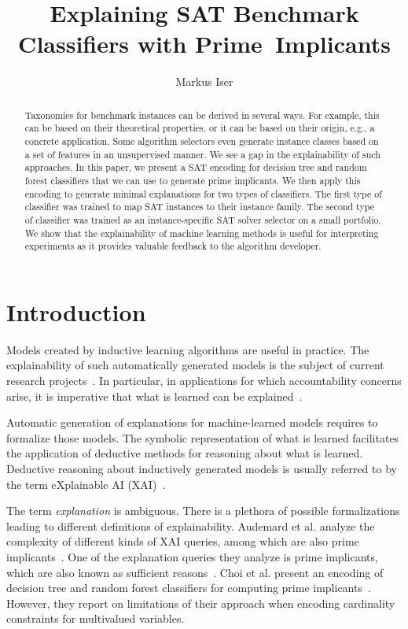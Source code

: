 \documentclass[a4paper, USenglish, cleveref, autoref, thm-restate]{lipics-v2021}
\title{Explaining SAT Benchmark Classifiers with Prime~Implicants}
\author{Markus Iser}{Karlsruhe Institute of Technology (KIT), Institute of Theoretical Informatics, Algorithm Engineering, Germany \and \url{https://algo2.iti.kit.edu/english/3986.php}}{markus.iser@kit.edu}{https://orcid.org/0000-0003-2904-232X}{}
\theoremstyle{definition}
\begin{document}
\maketitle
\begin{abstract}
Taxonomies for benchmark instances can be derived in several ways. For example, this can be based on their theoretical properties, or it can be based on their origin, e.g., a concrete application. 
Some algorithm selectors even generate instance classes based on a set of features in an unsupervised manner. 
We see a gap in the explainability of such approaches. 
In this paper, we present a SAT encoding for decision tree and random forest classifiers that we can use to generate prime implicants. 
We then apply this encoding to generate minimal explanations for two types of classifiers. 
The first type of classifier was trained to map SAT instances to their instance family.
The second type of classifier was trained as an instance-specific SAT solver selector on a small portfolio.
We show that the explainability of machine learning methods is useful for interpreting experiments as it provides valuable feedback to the algorithm developer.
\end{abstract}


\section{Introduction}

Models created by inductive learning algorithms are useful in practice.
The explainability of such automatically generated models is the subject of current research projects~\cite{Audemard:2021:Intelligibility, Darwiche:2020:Reasons}.
In particular, in applications for which accountability concerns arise, it is imperative that what is learned can be explained~\cite{Percy:2021:Accountability}. 

Automatic generation of explanations for machine-learned models requires to formalize those models. 
The symbolic representation of what is learned facilitates the application of deductive methods for reasoning about what is learned.
Deductive reasoning about inductively generated models is usually referred to by the term eXplainable AI (XAI)~\cite{Arrieta:2019:XAI}. 

The term \emph{explanation} is ambiguous. 
There is a plethora of possible formalizations leading to different definitions of explainability. 
Audemard et al. analyze the complexity of different kinds of XAI queries, among which are also prime implicants~\cite{Audemard:2020:XAI}. 
One of the explanation queries they analyze is prime implicants, which are also known as sufficient reasons~\cite{Darwiche:2020:Reasons}. 
Choi et al. present an encoding of decision tree and random forest classifiers for computing prime implicants~\cite{Choi:2020:RF}. 
However, they report on limitations of their approach when encoding cardinality constraints for multivalued variables. 
\end{document}
